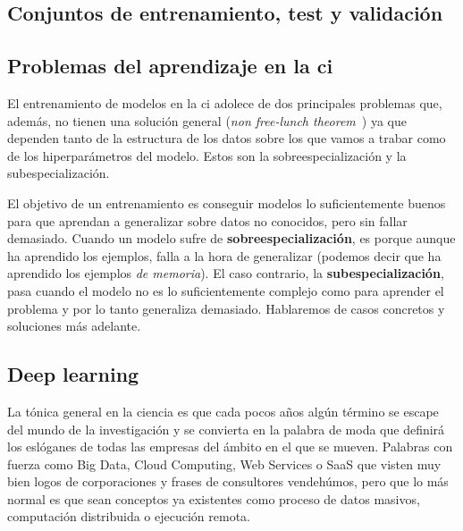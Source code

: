 \subsection{Conjuntos de entrenamiento, test y validación}



\subsection{Problemas del aprendizaje en la \acrlong{ci}}

El entrenamiento de modelos en la \gls{ci} adolece de dos principales problemas que, además, no tienen una solución general (\textit{non free-lunch theorem}~\cite{wolpert1997no}) ya que dependen tanto de la estructura de los datos sobre los que vamos a trabar como de los hiperparámetros del modelo. Estos son la sobreespecialización y la subespecialización.

El objetivo de un entrenamiento es conseguir modelos lo suficientemente buenos para que aprendan a generalizar sobre datos no conocidos, pero sin fallar demasiado. Cuando un modelo sufre de \textbf{sobreespecialización}, es porque aunque ha aprendido los ejemplos, falla a la hora de generalizar (podemos decir que ha aprendido los ejemplos \textit{de memoria}). El caso contrario, la \textbf{subespecialización}, pasa cuando el modelo no es lo suficientemente complejo como para aprender el problema y por lo tanto generaliza demasiado. Hablaremos de casos concretos y soluciones más adelante.

\subsection{Deep learning}

La tónica general en la ciencia es que cada pocos años algún término se escape del mundo de la investigación y se convierta en la palabra de moda que definirá los eslóganes de todas las empresas del ámbito en el que se mueven. Palabras con fuerza como Big Data, Cloud Computing, Web Services o SaaS que visten muy bien logos de corporaciones y frases de consultores vendehúmos, pero que lo más normal es que sean conceptos ya existentes como proceso de datos masivos, computación distribuida o ejecución remota.

